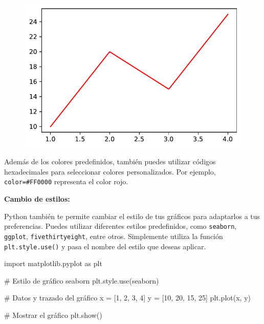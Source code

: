 \documentclass[
  a4paper,
]{article}
\newenvironment{Shaded}{}{}
\newcommand{\CommentTok}[1]{\textcolor[rgb]{0.42,0.45,0.49}{#1}}
\newcommand{\DecValTok}[1]{\textcolor[rgb]{0.00,0.36,0.77}{#1}}
\newcommand{\ImportTok}[1]{\textcolor[rgb]{0.01,0.18,0.38}{#1}}
\newcommand{\NormalTok}[1]{\textcolor[rgb]{0.14,0.16,0.18}{#1}}
\newcommand{\OperatorTok}[1]{\textcolor[rgb]{0.14,0.16,0.18}{#1}}
\newcommand{\StringTok}[1]{\textcolor[rgb]{0.01,0.18,0.38}{#1}}
\begin{document}
\begin{figure}[H]

{\centering \includegraphics{index_files/figure-pdf/cell-7-output-1.pdf}

}

\end{figure}

Además de los colores predefinidos, también puedes utilizar códigos
hexadecimales para seleccionar colores personalizados. Por ejemplo,
\texttt{color=\textquotesingle{}\#FF0000\textquotesingle{}} representa
el color rojo.

\textbf{Cambio de estilos:}

Python también te permite cambiar el estilo de tus gráficos para
adaptarlos a tus preferencias. Puedes utilizar diferentes estilos
predefinidos, como \texttt{\textquotesingle{}seaborn\textquotesingle{}},
\texttt{\textquotesingle{}ggplot\textquotesingle{}},
\texttt{\textquotesingle{}fivethirtyeight\textquotesingle{}}, entre
otros. Simplemente utiliza la función \texttt{plt.style.use()} y pasa el
nombre del estilo que deseas aplicar.

\begin{Shaded}
\begin{Highlighting}[]
\ImportTok{import}\NormalTok{ matplotlib.pyplot }\ImportTok{as}\NormalTok{ plt}

\CommentTok{\# Estilo de gráfico \textquotesingle{}seaborn\textquotesingle{}}
\NormalTok{plt.style.use(}\StringTok{\textquotesingle{}seaborn\textquotesingle{}}\NormalTok{)}

\CommentTok{\# Datos y trazado del gráfico}
\NormalTok{x }\OperatorTok{=}\NormalTok{ [}\DecValTok{1}\NormalTok{, }\DecValTok{2}\NormalTok{, }\DecValTok{3}\NormalTok{, }\DecValTok{4}\NormalTok{]}
\NormalTok{y }\OperatorTok{=}\NormalTok{ [}\DecValTok{10}\NormalTok{, }\DecValTok{20}\NormalTok{, }\DecValTok{15}\NormalTok{, }\DecValTok{25}\NormalTok{]}
\NormalTok{plt.plot(x, y)}

\CommentTok{\# Mostrar el gráfico}
\NormalTok{plt.show()}
\end{Highlighting}
\end{Shaded}
\end{document}
